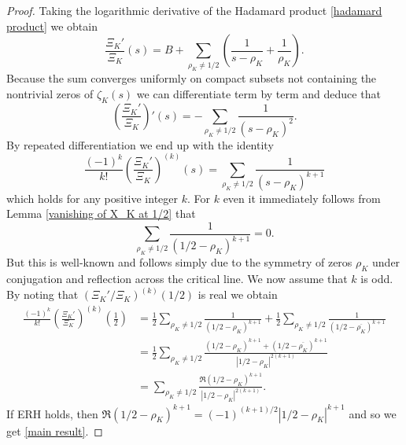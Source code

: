 \documentclass[12pt]{amsart}
\numberwithin{equation}{section}
\theoremstyle{myplain}
\theoremstyle{mydefinition}
\theoremstyle{plain}
\theoremstyle{definition}
\begin{document}
\begin{proof}
Taking the logarithmic derivative of the Hadamard product \eqref{hadamard product} we obtain
\[
\frac{\Xi_K'}{\Xi_K}(s) = B + \sum_{\rho_K \neq 1/2} \left( \frac{1}{s - \rho_K} + \frac{1}{\rho_K} \right).
\]
Because the sum converges uniformly on compact subsets not containing the nontrivial zeros of $\zeta_K(s)$ we can differentiate term by term and deduce that
\[
\left( \frac{\Xi_K'}{\Xi_K} \right)'(s) = - \sum_{\rho_K \neq 1/2} \frac{1}{(s - \rho_K)^2}.
\]
By repeated differentiation we end up with the identity
\[
\frac{(-1)^k}{k!}\left( \frac{\Xi_K'}{\Xi_K} \right)^{(k)}(s) = \sum_{\rho_K \neq 1/2} \frac{1}{(s - \rho_K)^{k + 1}}
\]
which holds for any positive integer $k$. For $k$ even it immediately follows from Lemma \ref{vanishing of X_K at 1/2} that
\[
\sum_{\rho_K \neq 1/2} \frac{1}{(1/2 - \rho_K)^{k + 1}} = 0.
\]
But this is well-known and follows simply due to the symmetry of zeros $\rho_K$ under conjugation and reflection across the critical line. We now assume that $k$ is odd. By noting that $(\Xi_K'/\Xi_K)^{(k)} (1/2)$ is real we obtain
\begin{align*}
\frac{(-1)^k}{k!}\left( \frac{\Xi_K'}{\Xi_K} \right)^{(k)} \left( \frac{1}{2} \right) &= \frac{1}{2}\sum_{\rho_K \neq 1/2} \frac{1}{(1/2 - \rho_K)^{k + 1}} + \frac{1}{2} \sum_{\rho_K \neq 1/2} \frac{1}{(1/2 - \overline{\rho_K})^{k + 1}}  \\
&= \frac{1}{2} \sum_{\rho_K \neq 1/2} \frac{(1/2 - \rho_K)^{k + 1} + (1/2 - \overline{\rho_K})^{k + 1}}{|1/2 - \rho_K|^{2(k + 1)}} \\
&= \sum_{\rho_K \neq 1/2} \frac{\Re(1/2 - \rho_K)^{k + 1}}{|1/2 - \rho_K|^{2(k + 1)}}.
\end{align*}
If ERH holds, then $\Re(1/2 - \rho_K)^{k + 1} = (-1)^{(k + 1)/2} |1/2 - \rho_K|^{k + 1}$ and so we get \eqref{main result}.


\end{proof}
\end{document}
